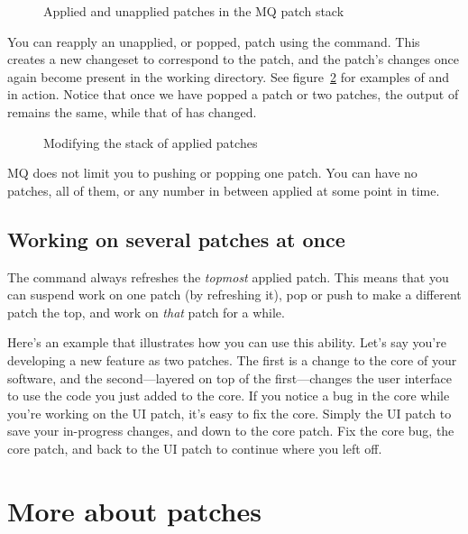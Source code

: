 \begin{figure}[ht]
  \centering
  \caption{Applied and unapplied patches in the MQ patch stack}
  \label{fig:mq:stack}
\end{figure}

You can reapply an unapplied, or popped, patch using the 
command.  This creates a new changeset to correspond to the patch, and
the patch's changes once again become present in the working
directory.  See figure~\ref{ex:mq:qpop} for examples of 
and  in action.  Notice that once we have popped a patch
or two patches, the output of  remains the same, while
that of  has changed.

\begin{figure}[ht]
  \caption{Modifying the stack of applied patches}
  \label{ex:mq:qpop}
\end{figure}

MQ does not limit you to pushing or popping one patch.  You can have
no patches, all of them, or any number in between applied at some
point in time.

\subsection{Working on several patches at once}

The  command always refreshes the \emph{topmost}
applied patch.  This means that you can suspend work on one patch (by
refreshing it), pop or push to make a different patch the top, and
work on \emph{that} patch for a while.

Here's an example that illustrates how you can use this ability.
Let's say you're developing a new feature as two patches.  The first
is a change to the core of your software, and the second---layered on
top of the first---changes the user interface to use the code you just
added to the core.  If you notice a bug in the core while you're
working on the UI patch, it's easy to fix the core.  Simply
 the UI patch to save your in-progress changes, and
 down to the core patch.  Fix the core bug,
 the core patch, and  back to the UI
patch to continue where you left off.

\section{More about patches}
\label{sec:mq:adv-patch}

